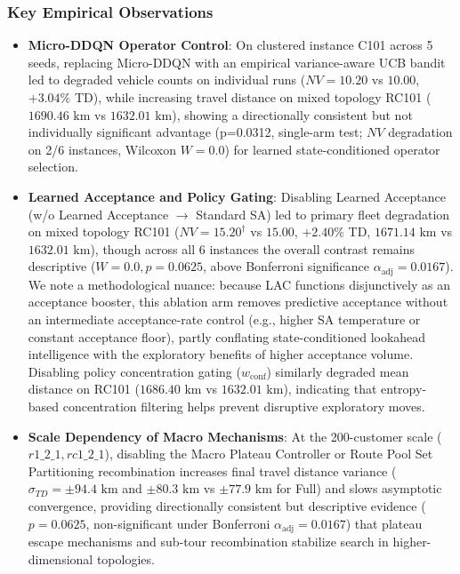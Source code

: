 \documentclass{ieeeaccess}
\begin{document}
\subsubsection{Key Empirical Observations}
\begin{itemize}
    \item \textbf{Micro-DDQN Operator Control}: On clustered instance C101 across 5 seeds, replacing Micro-DDQN with an empirical variance-aware UCB bandit led to degraded vehicle counts on individual runs ($NV=10.20$ vs $10.00$, $+3.04\%$ TD), while increasing travel distance on mixed topology RC101 ($1690.46\text{ km}$ vs $1632.01\text{ km}$), showing a directionally consistent but not individually significant advantage (p=0.0312, single-arm test; $NV$ degradation on 2/6 instances, Wilcoxon $W=0.0$) for learned state-conditioned operator selection.
    \item \textbf{Learned Acceptance and Policy Gating}: Disabling Learned Acceptance (\textsf{\small w/o Learned Acceptance $\to$ Standard SA}) led to primary fleet degradation on mixed topology RC101 ($NV=15.20^\dagger$ vs $15.00$, $+2.40\%$ TD, $1671.14\text{ km}$ vs $1632.01\text{ km}$), though across all 6 instances the overall contrast remains descriptive ($W=0.0, p=0.0625$, above Bonferroni significance $\alpha_{\text{adj}}=0.0167$). We note a methodological nuance: because LAC functions disjunctively as an acceptance booster, this ablation arm removes predictive acceptance without an intermediate acceptance-rate control (e.g., higher SA temperature or constant acceptance floor), partly conflating state-conditioned lookahead intelligence with the exploratory benefits of higher acceptance volume. Disabling policy concentration gating ($w_{\text{conf}}$) similarly degraded mean distance on RC101 ($1686.40\text{ km}$ vs $1632.01\text{ km}$), indicating that entropy-based concentration filtering helps prevent disruptive exploratory moves.
    \item \textbf{Scale Dependency of Macro Mechanisms}: At the 200-customer scale ($r1\_2\_1, rc1\_2\_1$), disabling the Macro Plateau Controller or Route Pool Set Partitioning recombination increases final travel distance variance ($\sigma_{TD} = \pm 94.4\text{ km}$ and $\pm 80.3\text{ km}$ vs $\pm 77.9\text{ km}$ for Full) and slows asymptotic convergence, providing directionally consistent but descriptive evidence ($p=0.0625$, non-significant under Bonferroni $\alpha_{\text{adj}}=0.0167$) that plateau escape mechanisms and sub-tour recombination stabilize search in higher-dimensional topologies.

\end{itemize}
\end{document}
